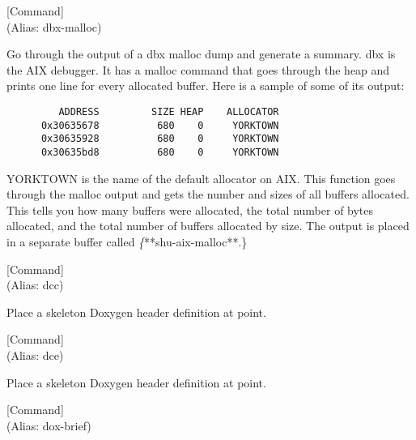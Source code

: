 \vspace{1em}
\noindent
{}
\usebox{\funcname}
 \hfill [Command]\\%
 (Alias: dbx-malloc)

\begin{doc-string}
Go through the output of a dbx malloc dump and generate a summary.  dbx is
the AIX debugger.  It has a malloc command that goes through the heap and prints
one line for every allocated buffer.  Here is a sample of some of its output:

\small{\begin{verbatim}
         ADDRESS         SIZE HEAP    ALLOCATOR
      0x30635678          680    0     YORKTOWN
      0x30635928          680    0     YORKTOWN
      0x30635bd8          680    0     YORKTOWN
\end{verbatim}}

YORKTOWN is the name of the default allocator on AIX.  This function goes
through the malloc output and gets the number and sizes of all buffers
allocated.  This tells you how many buffers were allocated, the total number of
bytes allocated, and the total number of buffers allocated by size.  The output
is placed in a separate buffer called \emph\{**shu-aix-malloc**.\}
\end{doc-string}

\vspace{1em}
\noindent
{}
\usebox{\funcname}
 \hfill [Command]\\%
 (Alias: dcc)

\begin{doc-string}
Place a skeleton Doxygen header definition at point.
\end{doc-string}

\vspace{1em}
\noindent
{}
\usebox{\funcname}
 \hfill [Command]\\%
 (Alias: dce)

\begin{doc-string}
Place a skeleton Doxygen header definition at point.
\end{doc-string}

\vspace{1em}
\noindent
{}
\usebox{\funcname}
 \hfill [Command]\\%
 (Alias: dox-brief)

